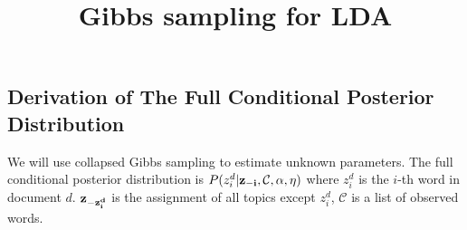 \documentclass[11pt]{article}
\date{\vspace{-5ex}}
\begin{document}
\newcommand\ddfrac[2]{\frac{\displaystyle #1}{\displaystyle #2}}
\begin{spacing}{1.6}
\title{Gibbs sampling for LDA}
\maketitle

\section{Derivation of The Full Conditional Posterior Distribution}
We will use collapsed Gibbs sampling to estimate unknown parameters. The full conditional posterior distribution is $P({z^d_i}| {\bf{z}_{-i}},\mathcal{C},\alpha,\eta)$ where ${z^d_i}$ is the $i$-th word in document $d$. ${\bf{z}_{-z^d_i}}$ is the assignment of all topics except ${z^d_i}$, $\mathcal{C}$ is a list of observed words.\\


\end{spacing}
\end{document}
